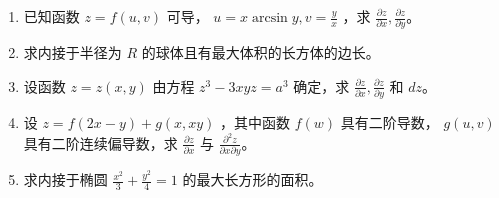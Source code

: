 \documentclass[12pt, a4paper]{article}
\begin{document}
\begin{enumerate}
    \item 已知函数 $ z = f(u, v) $ 可导， $ u = x \arcsin y, v = \frac{y}{x} $ ，求 $ \frac{\partial z}{\partial x}, \frac{\partial z}{\partial y} $。

    \item 求内接于半径为 $R$ 的球体且有最大体积的长方体的边长。

    \item 设函数 $ z = z(x, y) $ 由方程 $ z^{3} - 3xyz = a^{3} $ 确定，求 $ \frac{\partial z}{\partial x}, \frac{\partial z}{\partial y} $ 和 $dz$。

    \item 设 $ z = f(2x - y) + g(x, xy) $ ，其中函数 $ f(w) $ 具有二阶导数， $ g(u, v) $ 具有二阶连续偏导数，求 $ \frac{\partial z}{\partial x} $ 与 $ \frac{\partial^{2}z}{\partial x \partial y} $。

    \item 求内接于椭圆 $ \frac{x^{2}}{3}+\frac{y^{2}}{4}=1 $ 的最大长方形的面积。
\end{enumerate}
\end{document}
